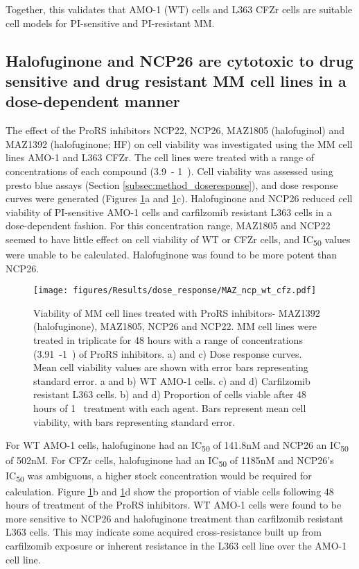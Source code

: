 Together, this validates that AMO-1 (WT) cells and L363 CFZr cells are suitable cell models for PI-sensitive and PI-resistant MM\@.

\subsection{Halofuginone and NCP26 are cytotoxic to drug sensitive and drug resistant MM cell lines in a dose-dependent manner}\label{subsec:pro_cell_viability}
The effect of the ProRS inhibitors NCP22, NCP26, MAZ1805 (halofuginol) and MAZ1392 (halofuginone; HF) on cell viability was investigated using the MM cell lines AMO-1 and L363 CFZr.
The cell lines were treated with a range of concentrations of each compound (3.9\si{\nano\Molar}- 1\si{\micro\Molar}).
Cell viability was assessed using presto blue assays (Section \ref{subsec:method_doseresponse}), and dose response curves were generated (Figures \ref{fig:dose}a and \ref{fig:dose}c).
Halofuginone and NCP26 reduced cell viability of PI-sensitive AMO-1 cells and carfilzomib resistant L363 cells in a dose-dependent fashion.
For this concentration range, MAZ1805 and NCP22 seemed to have little effect on cell viability of WT or CFZr cells, and IC\textsubscript{50} values were unable to be calculated.
Halofuginone was found to be more potent than NCP26.
%
\begin{figure}[h]
\centering
\texttt{[image: figures/Results/dose\_response/MAZ\_ncp\_wt\_cfz.pdf]}
\caption[ProRS inhibitors dose response curves]{Viability of MM cell lines treated with ProRS inhibitors- MAZ1392 (halofuginone), MAZ1805, NCP26 and NCP22.
MM cell lines were treated in triplicate for 48 hours with a range of concentrations (3.91\si{\nano\Molar}-1\si{\micro\Molar}) of ProRS inhibitors.
a) and c) Dose response curves.
Mean cell viability values are shown with error bars representing standard error.
a and b) WT AMO-1 cells.
c) and d) Carfilzomib resistant L363 cells.
b) and d) Proportion of cells viable after 48 hours of 1\si{\micro\Molar} treatment with each agent.
Bars represent mean cell viability, with bars representing standard error.}
\label{fig:dose}
\end{figure}

For WT AMO-1 cells, halofuginone had an IC\textsubscript{50} of 141.8nM and NCP26 an IC\textsubscript{50} of 502nM. For CFZr cells, halofuginone had an IC\textsubscript{50} of 1185nM and NCP26's IC\textsubscript{50} was ambiguous, a higher stock concentration would be required for calculation.
Figure \ref{fig:dose}b and \ref{fig:dose}d show the proportion of viable cells following 48 hours of treatment of the ProRS inhibitors.
WT AMO-1 cells were found to be more sensitive to NCP26 and halofuginone treatment than carfilzomib resistant L363 cells.
This may indicate some acquired cross-resistance built up from carfilzomib exposure or inherent resistance in the L363 cell line over the AMO-1 cell line.

